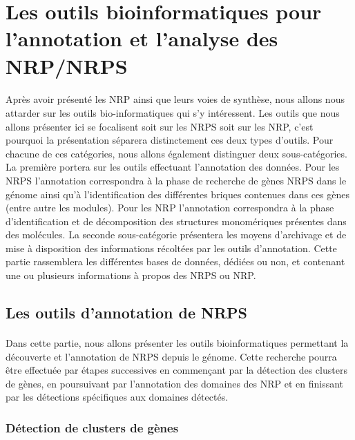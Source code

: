 \documentclass[12pt,french,twoside]{report}
\begin{document}
\section{Les outils bioinformatiques pour l'annotation et l'analyse des NRP/NRPS}

\paragraph{}Après avoir présenté les NRP ainsi que leurs voies de synthèse, nous allons nous attarder sur les outils bio-informatiques qui s'y intéressent.
Les outils que nous allons présenter ici se focalisent soit sur les NRPS soit sur les NRP, c'est pourquoi la présentation séparera distinctement ces deux types d'outils.
Pour chacune de ces catégories, nous allons également distinguer deux sous-catégories.
La première portera sur les outils effectuant l'annotation des données.
Pour les NRPS l'annotation correspondra à la phase de recherche de gènes NRPS dans le génome ainsi qu'à l'identification des différentes briques contenues dans ces gènes (entre autre les modules).
Pour les NRP l'annotation correspondra à la phase d'identification et de décomposition des structures monomériques présentes dans des molécules.
La seconde sous-catégorie présentera les moyens d'archivage et de mise à disposition des informations récoltées par les outils d'annotation.
Cette partie rassemblera les différentes bases de données, dédiées ou non, et contenant une ou plusieurs informations à propos des NRPS ou NRP.

\subsection{Les outils d'annotation de NRPS}

\paragraph{}Dans cette partie, nous allons présenter les outils bioinformatiques permettant la découverte et l'annotation de NRPS depuis le génome.
Cette recherche pourra être effectuée par étapes successives en commençant par la détection des clusters de gènes, en poursuivant par l'annotation des domaines des NRP et en finissant par les détections spécifiques aux domaines détectés.

\subsubsection{Détection de clusters de gènes}
\end{document}
